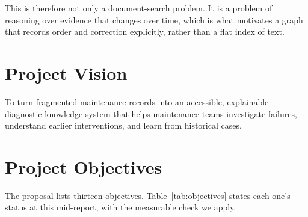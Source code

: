 This is therefore not only a document-search problem. It is a problem of reasoning over evidence that changes over time, which is what motivates a graph that records order and correction explicitly, rather than a flat index of text.

\section{Project Vision}
To turn fragmented maintenance records into an accessible, explainable diagnostic knowledge system that helps maintenance teams investigate failures, understand earlier interventions, and learn from historical cases.

\section{Project Objectives}
The proposal lists thirteen objectives. Table~\ref{tab:objectives} states each one's status at this mid-report, with the measurable check we apply.

